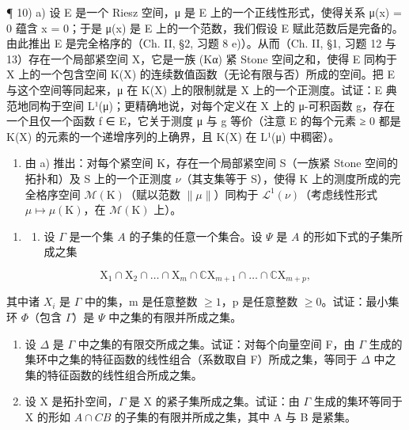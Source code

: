 ¶ 10) a) 设 E 是一个 Riesz 空间，μ 是 E 上的一个正线性形式，使得关系 μ(\textbar x\textbar) = 0 蕴含 x = 0；于是 μ(\textbar x\textbar) 是 E 上的一个范数，我们假设 E 赋此范数后是完备的。由此推出 E 是完全格序的（Ch. II, §2, 习题 8 e)）。从而（Ch. II, §1, 习题 12 与 13）存在一个局部紧空间 X，它是一族 (Kα) 紧 Stone 空间之和，使得 E 同构于 X 上的一个包含空间 K(X) 的连续数值函数（无论有限与否）所成的空间。把 E 与这个空间等同起来，μ 在 K(X) 上的限制就是 X 上的一个正测度。试证：E 典范地同构于空间 L¹(μ)；更精确地说，对每个定义在 X 上的 μ-可积函数 g，存在一个且仅一个函数 f ∈ E，它关于测度 μ 与 g 等价（注意 E 的每个元素 ≥ 0 都是 K(X) 的元素的一个递增序列的上确界，且 K(X) 在 L¹(μ) 中稠密）。

\begin{enumerate}
\def\labelenumi{\alph{enumi})}
\setcounter{enumi}{1}
\tightlist
\item
  由 a) 推出：对每个紧空间 K，存在一个局部紧空间 S（一族紧 Stone 空间的拓扑和）及 S 上的一个正测度 \(\nu\)（其支集等于 S），使得 K 上的测度所成的完全格序空间 \(\mathcal{M}(\mathrm{K})\)（赋以范数 \(\|\mu\|\)）同构于 \(\mathcal{L}^{1}(\nu)\)（考虑线性形式 \(\mu\mapsto\mu(\mathrm{K})\)，在 \(\mathcal{M}(\mathrm{K})\) 上）。
\end{enumerate}

\begin{enumerate}
\def\labelenumi{\arabic{enumi})}
\setcounter{enumi}{10}
\tightlist
\item
  \begin{enumerate}
  \def\labelenumii{\alph{enumii})}
  \tightlist
  \item
    设 \(\Gamma\) 是一个集 \(A\) 的子集的任意一个集合。设 \(\Psi\) 是 \(A\) 的形如下式的子集所成之集
  \end{enumerate}
\end{enumerate}

\[
\mathrm{X} _ {1} \cap \mathrm{X} _ {2} \cap \dots \cap \mathrm{X} _ {m} \cap \mathbb {C} \mathrm{X} _ {m + 1} \cap \dots \cap \mathbb {C} \mathrm{X} _ {m + p},
\]

其中诸 \(X_{i}\) 是 \(\Gamma\) 中的集，m 是任意整数 \(\geqslant 1\)，p 是任意整数 \(\geqslant 0\)。试证：最小集环 \(\Phi\)（包含 \(\Gamma\)）是 \(\Psi\) 中之集的有限并所成之集。

\begin{enumerate}
\def\labelenumi{\alph{enumi})}
\setcounter{enumi}{1}
\item
  设 \(\Delta\) 是 \(\Gamma\) 中之集的有限交所成之集。试证：对每个向量空间 F，由 \(\Gamma\) 生成的集环中之集的特征函数的线性组合（系数取自 F）所成之集，等同于 \(\Delta\) 中之集的特征函数的线性组合所成之集。
\item
  设 X 是拓扑空间，\(\Gamma\) 是 X 的紧子集所成之集。试证：由 \(\Gamma\) 生成的集环等同于 X 的形如 \(A \cap CB\) 的子集的有限并所成之集，其中 A 与 B 是紧集。
\end{enumerate}

